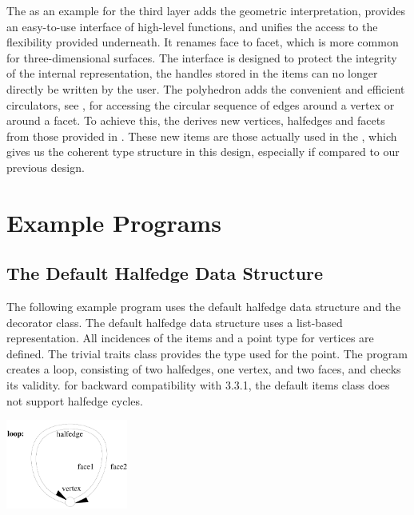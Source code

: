 The  as an example for the third layer adds the
geometric interpretation, provides an easy-to-use interface of
high-level functions, and unifies the access to the flexibility
provided underneath.  It renames face to facet, which is more common
for three-dimensional surfaces.  The interface is designed to protect
the integrity of the internal representation, the handles stored in
the items can no longer directly be written by the user.  The
polyhedron adds the convenient and efficient circulators, see
, for accessing the circular sequence of edges
around a vertex or around a facet. To achieve this, the
 derives new vertices, halfedges and facets from those
provided in .  These new items are those actually used in
the , which gives us the coherent type
structure in this design, especially if compared to our previous
design.


\section{Example Programs}
\label{sectionHdsExamples}


\subsection{The Default Halfedge Data Structure}

The following example program uses the default halfedge data structure
and the decorator class. The default halfedge data structure uses a
list-based representation. All incidences of the items and a point
type for vertices are defined. The trivial traits class provides the
type used for the point. The program creates a loop, consisting
of two halfedges, one vertex, and two faces, and checks its validity.
{\XHDS for backward compatibility with 3.3.1, the default items class
 does not support halfedge cycles.}

\begin{ccTexOnly}
    \vspace{-4mm}
    \begin{center}
      \parbox{0.3\textwidth}{%
          \includegraphics[width=0.3\textwidth]{HalfedgeDS/fig/loop}%
      }
    \end{center}
    \vspace{-3mm}
\end{ccTexOnly}

